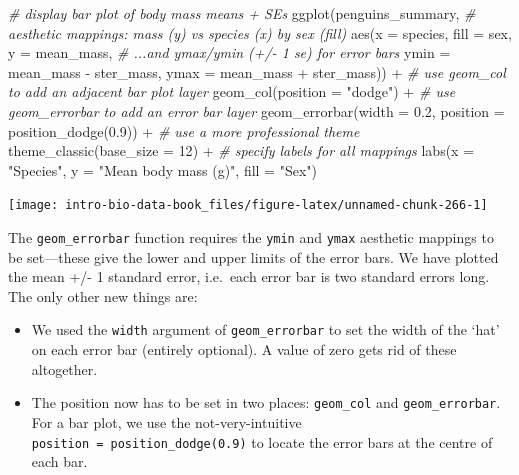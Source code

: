 \documentclass[
]{book}
\newenvironment{Shaded}{\begin{snugshade}}{\end{snugshade}}
\newcommand{\AttributeTok}[1]{\textcolor[rgb]{0.77,0.63,0.00}{#1}}
\newcommand{\CommentTok}[1]{\textcolor[rgb]{0.56,0.35,0.01}{\textit{#1}}}
\newcommand{\DecValTok}[1]{\textcolor[rgb]{0.00,0.00,0.81}{#1}}
\newcommand{\FloatTok}[1]{\textcolor[rgb]{0.00,0.00,0.81}{#1}}
\newcommand{\FunctionTok}[1]{\textcolor[rgb]{0.00,0.00,0.00}{#1}}
\newcommand{\NormalTok}[1]{#1}
\newcommand{\SpecialCharTok}[1]{\textcolor[rgb]{0.00,0.00,0.00}{#1}}
\newcommand{\StringTok}[1]{\textcolor[rgb]{0.31,0.60,0.02}{#1}}
\providecommand{\tightlist}{%
  \setlength{\itemsep}{0pt}\setlength{\parskip}{0pt}}
\begin{document}
\begin{Shaded}
\begin{Highlighting}[]
\CommentTok{\# display bar plot of body mass means + SE\textquotesingle{}s}
\FunctionTok{ggplot}\NormalTok{(penguins\_summary, }
       \CommentTok{\# aesthetic mappings: mass (y) vs species (x) by sex (fill) }
       \FunctionTok{aes}\NormalTok{(}\AttributeTok{x =}\NormalTok{ species, }\AttributeTok{fill =}\NormalTok{ sex, }\AttributeTok{y =}\NormalTok{ mean\_mass, }
           \CommentTok{\# ...and ymax/ymin (+/{-} 1 se) for error bars}
           \AttributeTok{ymin =}\NormalTok{ mean\_mass }\SpecialCharTok{{-}}\NormalTok{ ster\_mass, }\AttributeTok{ymax =}\NormalTok{ mean\_mass }\SpecialCharTok{+}\NormalTok{ ster\_mass)) }\SpecialCharTok{+} 
  \CommentTok{\# use geom\_col to add an adjacent bar plot layer}
  \FunctionTok{geom\_col}\NormalTok{(}\AttributeTok{position =} \StringTok{"dodge"}\NormalTok{) }\SpecialCharTok{+} 
  \CommentTok{\# use geom\_errorbar to add an error bar layer}
  \FunctionTok{geom\_errorbar}\NormalTok{(}\AttributeTok{width =} \FloatTok{0.2}\NormalTok{, }\AttributeTok{position =} \FunctionTok{position\_dodge}\NormalTok{(}\FloatTok{0.9}\NormalTok{)) }\SpecialCharTok{+} 
  \CommentTok{\# use a more professional theme }
  \FunctionTok{theme\_classic}\NormalTok{(}\AttributeTok{base\_size =} \DecValTok{12}\NormalTok{) }\SpecialCharTok{+} 
  \CommentTok{\# specify labels for all mappings}
  \FunctionTok{labs}\NormalTok{(}\AttributeTok{x =} \StringTok{"Species"}\NormalTok{, }\AttributeTok{y =} \StringTok{"Mean body mass (g)"}\NormalTok{, }\AttributeTok{fill =} \StringTok{"Sex"}\NormalTok{)}
\end{Highlighting}
\end{Shaded}

\begin{center}\texttt{[image: intro-bio-data-book\_files/figure-latex/unnamed-chunk-266-1]} \end{center}

The \texttt{geom\_errorbar} function requires the \texttt{ymin} and \texttt{ymax} aesthetic mappings to be set---these give the lower and upper limits of the error bars. We have plotted the mean +/- 1 standard error, i.e.~each error bar is two standard errors long. The only other new things are:

\begin{itemize}
\tightlist
\item
  We used the \texttt{width} argument of \texttt{geom\_errorbar} to set the width of the `hat' on each error bar (entirely optional). A value of zero gets rid of these altogether.
\item
  The position now has to be set in two places: \texttt{geom\_col} and \texttt{geom\_errorbar}. For a bar plot, we use the not-very-intuitive \texttt{position\ =\ position\_dodge(0.9)} to locate the error bars at the centre of each bar.
\end{itemize}
\end{document}
